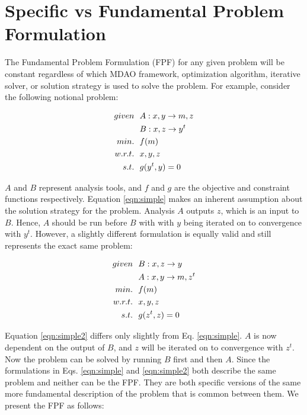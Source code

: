 \section{Specific vs Fundamental Problem Formulation }
	\label{s:specific vs fundamental}
    The Fundamental Problem Formulation (FPF) for any given problem will be constant regardless 
    of which MDAO framework, optimization algorithm, iterative solver, or solution strategy
    is used to solve the problem. For example, consider the following notional problem: 

    \begin{align}
        given & \ \ A: {x,y} \rightarrow {m,z} \notag
        \\      & \ \ B: {x,z} \rightarrow {y^t} \notag
        \\min. &\ \ f(m) \notag
        \\w.r.t. & \ \ x,y,z \notag
        \\s.t. & \ \ g(y^t,y) = 0
        \label{eqn:simple}
    \end{align}

    $A$ and $B$ represent analysis tools, and $f$ and $g$ are the objective and constraint functions respectively. 
    Equation \ref{eqn:simple} makes an inherent assumption about the solution strategy for the problem. 
    Analysis $A$ outputs $z$, which is an input to $B$. Hence, $A$ should be run before $B$ with 
    with $y$ being iterated on to convergence with $y^t$. However, a slightly different formulation is 
    equally valid and still represents the exact same problem: 

    \begin{align}
        given & \ \ B: {x,z} \rightarrow {y} \notag
        \\      & \ \ A: {x,y} \rightarrow {m,z^t} \notag
        \\min. &\ \ f(m) \notag
        \\w.r.t. & \ \ x,y,z \notag
        \\s.t. & \ \ g(z^t,z) = 0
        \label{eqn:simple2}
    \end{align}

    Equation \ref{eqn:simple2} differs only slightly from Eq. \ref{eqn:simple}. $A$ is now dependent on the output of $B$, 
    and $z$ will be iterated on to convergence with $z^t$. Now the problem can be solved by running $B$ first and then $A$.
    Since the formulations in Eqs. \ref{eqn:simple} and \ref{eqn:simple2} both describe the same problem and neither can be the
    FPF. They are both specific versions of the same more fundamental description of 
    the problem that is common between them. We present the FPF as follows: 

